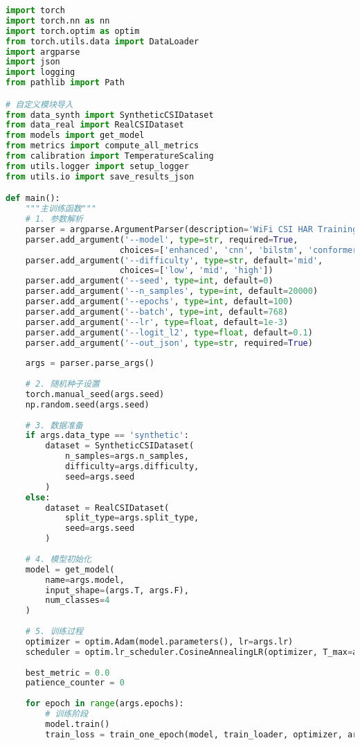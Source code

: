 \begin{lstlisting}[language=Python,caption=训练评估主程序结构]
import torch
import torch.nn as nn
import torch.optim as optim
from torch.utils.data import DataLoader
import argparse
import json
import logging
from pathlib import Path

# 自定义模块导入
from data_synth import SyntheticCSIDataset
from data_real import RealCSIDataset
from models import get_model
from metrics import compute_all_metrics
from calibration import TemperatureScaling
from utils.logger import setup_logger
from utils.io import save_results_json

def main():
    """主训练函数"""
    # 1. 参数解析
    parser = argparse.ArgumentParser(description='WiFi CSI HAR Training')
    parser.add_argument('--model', type=str, required=True,
                       choices=['enhanced', 'cnn', 'bilstm', 'conformer_lite'])
    parser.add_argument('--difficulty', type=str, default='mid',
                       choices=['low', 'mid', 'high'])
    parser.add_argument('--seed', type=int, default=0)
    parser.add_argument('--n_samples', type=int, default=20000)
    parser.add_argument('--epochs', type=int, default=100)
    parser.add_argument('--batch', type=int, default=768)
    parser.add_argument('--lr', type=float, default=1e-3)
    parser.add_argument('--logit_l2', type=float, default=0.1)
    parser.add_argument('--out_json', type=str, required=True)
    
    args = parser.parse_args()
    
    # 2. 随机种子设置
    torch.manual_seed(args.seed)
    np.random.seed(args.seed)
    
    # 3. 数据准备
    if args.data_type == 'synthetic':
        dataset = SyntheticCSIDataset(
            n_samples=args.n_samples,
            difficulty=args.difficulty,
            seed=args.seed
        )
    else:
        dataset = RealCSIDataset(
            split_type=args.split_type,
            seed=args.seed
        )
    
    # 4. 模型初始化
    model = get_model(
        name=args.model,
        input_shape=(args.T, args.F),
        num_classes=4
    )
    
    # 5. 训练过程
    optimizer = optim.Adam(model.parameters(), lr=args.lr)
    scheduler = optim.lr_scheduler.CosineAnnealingLR(optimizer, T_max=args.epochs)
    
    best_metric = 0.0
    patience_counter = 0
    
    for epoch in range(args.epochs):
        # 训练阶段
        model.train()
        train_loss = train_one_epoch(model, train_loader, optimizer, args)
        

\end{lstlisting}
